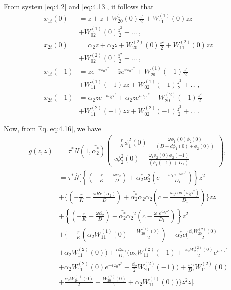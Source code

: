 \documentclass[10pt]{amsart}
\theoremstyle{definition}
\begin{document}
From system \eqref{eq:4.2} and \eqref{eq:4.13}, it follows that
\begin{align*}
x_{1t}(0)&=z + \bar{z}
+W_{20}^{1} (0) \frac{z^2}{2} + W_{11}^{(1)} (0) z \bar{z}\\
&+W_{02}^{(1)}(0) \frac{{\bar{z}}^2}{2} + \ldots ~,\\
x_{2t}(0) &=\alpha_2 z + \bar{\alpha_2} \bar{z} +W_{20}^{(2)}
(0) \frac{z^2}{2} + W_{11}^{(2)} (0) z \bar{z}\\
&+W_{02}^{(2)} (0)\frac{{\bar{z}}^2}{2} +  \ldots ~, \\
x_{1t}(-1) &= z e^{- i\omega_0
\tau^{*}}+  \bar{z}e^{i\omega_0
\tau^{*}} +W_{20}^{(1)} (-1) \frac{z^2}{2} \\
&+ W_{11}^{(1)} (-1) z
\bar{z} + W_{02}^{(1)} (-1)\frac{{\bar{z}}^2}{2} + \ldots ~, \\
 x_{2t}(-1) &=\alpha_2 z e^{- i\omega_0
\tau^{*}}+ \bar{\alpha_2} \bar{z}e^{i\omega_0
\tau^{*}} +W_{20}^{(2)} (-1) \frac{z^2}{2}\\
&+ W_{11}^{(2)} (-1) z\bar{z} + W_{02}^{(2)} (-1)\frac{{\bar{z}}^2}{2} +\ldots~. 
\end{align*}

Now, from Eq.\eqref{eq:4.16}, we have
\begin{align}\label{eq:4.17}
g(z,\bar z)&=\tau^{*}\bar N(1,\bar{\alpha_2^*})
\left(
                \begin{array}{c}
              {-\frac{r}{K}\phi_{1}^2(0)-\frac{\omega\phi_{1}(0)\phi_{2}(0)}{(D+d\phi_{1}(0)+\phi_{2}(0))}}\nonumber\\
              {c\phi_{2}^2(0)-\frac{ \omega_1 \phi_{2}(0)\phi_{2}(-1)}{(\phi_{1}(-1)+D_{1})}}
              \end{array}
              \right),\nonumber\\
&=\tau^* \bar N\Bigg[\left\lbrace\left(-\frac{r}{K}-\frac{\omega \alpha_2}{D}\right)+\bar{\alpha_2^*}\alpha_2^2\left(c-\frac{ \omega_1 e^{-i\omega_0 \tau^*}}{D_1}\right)\right\rbrace z^2\nonumber\\
&+\Bigg\{ \left(-\frac{r}{K}-\frac{\omega Re(\alpha_2)}{D}\right)+\bar{\alpha_2^*} \alpha_2 \bar{\alpha_2}\left(c-\frac{ \omega_1 cos(\omega_0 \tau^*)}{D_1}\right)\Bigg\} z \bar{z}\nonumber\\
&+\left\lbrace\left(-\frac{r}{K}-\frac{\omega \bar{\alpha_2}}{D}\right)+\bar{\alpha_2^*} \bar{\alpha_2}^2 \left(c-\frac{ \omega_1 e^{i\omega_0 \tau^*}}{D_1}\right)\right\rbrace {\bar z}^2\\
&+\Bigg\{ -\frac{r}{K}(\alpha_2  W_{11}^{(1)} (0)+ \frac{W_{20}^{(1)} (0)}{2})+\bar{\alpha_2^*}c(\frac{\bar{\alpha_2}W_{20}^{(2)} (0)}{2}\nonumber\\
&+\alpha_2 W_{11}^{(2)} (0))+\frac{\bar{\alpha_2^*} \omega_1}{D_1}(\alpha_2 W_{11}^{(2)} (-1)+\frac{\bar{\alpha_2} W_{20}^{(2)} (0)}{2}e^{i \omega_0 \tau^*}\nonumber\\
&+\alpha_2 W_{11}^{(2)} (0) e^{-i \omega_0 \tau^*}+\frac{\bar{\alpha_2}}{2}W_{20}^{(2)} (-1))+\frac{\omega}{D}(W_{11}^{(2)} (0)\nonumber\\
&+\frac{\bar{\alpha_2}W_{20}^{(1)} (0)}{2}+\frac{W_{20}^{(2)} (0)}{2}+\alpha_2W_{11}^{(1)} (0))\Bigg\}{z^2 \bar z}\Bigg].\nonumber
\end{align}
\end{document}
